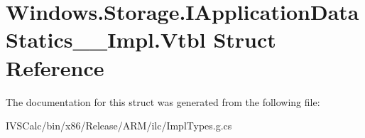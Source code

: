 \hypertarget{struct_windows_1_1_storage_1_1_i_application_data_statics_____impl_1_1_vtbl}{}\section{Windows.\+Storage.\+I\+Application\+Data\+Statics\+\_\+\+\_\+\+Impl.\+Vtbl Struct Reference}
\label{struct_windows_1_1_storage_1_1_i_application_data_statics_____impl_1_1_vtbl}


The documentation for this struct was generated from the following file\+:\begin{DoxyCompactItemize}
\item 
I\+V\+S\+Calc/bin/x86/\+Release/\+A\+R\+M/ilc/Impl\+Types.\+g.\+cs\end{DoxyCompactItemize}
